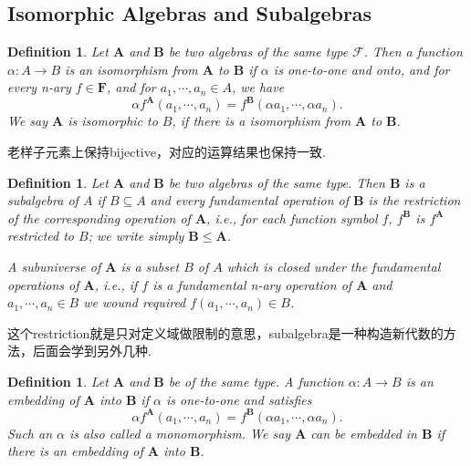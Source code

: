 \documentclass{article}
\newtheorem{definition}[theorem]{Definition}
\newcommand*{\xfunc}[4]{{#2}\colon{#3}{#1}{#4}}
\newcommand*{\func}[3]{\xfunc{\to}{#1}{#2}{#3}}
\begin{document}
\newpage
\subsection{Isomorphic Algebras and Subalgebras}

\begin{definition}
\rm Let $\mathbf{A}$ and $\mathbf{B}$ be two algebras of the {\color{red} same type} $\mathcal{F}$. Then a function $\func{\alpha}{A}{B}$ is an {\color{red} isomorphism} from $\mathbf{A}$ to $\mathbf{B}$ if $\alpha$ is one-to-one and onto, and for every n-ary $f \in \mathbf{F}$, and for $a_1,\cdots,a_n \in A$, we have
$$
\alpha f^\mathbf{A}(a_1,\cdots,a_n) = f^\mathbf{B}(\alpha a_1,\cdots,\alpha a_n).
$$
We say $\mathbf{A}$ is isomorphic to $B$, if there is a isomorphism from $\mathbf{A}$ to $\mathbf{B}$.
\end{definition}

{\color{blue} 老样子元素上保持bijective，对应的运算结果也保持一致}.

\begin{definition}
\rm Let $\mathbf{A}$ and $\mathbf{B}$ be two algebras of the same type. Then $\mathbf{B}$ is a {\color{red} subalgebra} of $A$ if $B \subseteq A$ and every fundamental operation of $\mathbf{B}$ is the restriction of the corresponding operation of $\mathbf{A}$, i.e., for each function symbol $f$, $f^\mathbf{B}$ is $f^\mathbf{A}$ restricted to $B$; we write simply $\mathbf{B} \leq \mathbf{A}$.

A {\color{red} subuniverse} of $\mathbf{A}$ is a subset $B$ of $A$ which is closed under the fundamental operations of $\mathbf{A}$, i.e., if $f$ is a fundamental n-ary operation of $\mathbf{A}$ and $a_1,\cdots,a_n \in B$ we wound required $f(a_1,\cdots,a_n) \in B$. 
\end{definition}

{\color{blue} 这个restriction就是只对定义域做限制的意思，subalgebra是一种构造新代数的方法，后面会学到另外几种}.

\begin{definition}
\rm Let $\mathbf{A}$ and $\mathbf{B}$ be of the same type. A function $\func{\alpha}{A}{B}$ is an embedding of $\mathbf{A}$ into $\mathbf{B}$ if $\alpha$ is one-to-one and satisfies
$$
\alpha f^\mathbf{A}(a_1,\cdots,a_n) = f^\mathbf{B}(\alpha a_1,\cdots,\alpha a_n).
$$
Such an $\alpha$ is also called a monomorphism. We say $\mathbf{A}$ can be embedded in $\mathbf{B}$ if there is an embedding of $\mathbf{A}$ into $\mathbf{B}$.
\end{definition}
\end{document}
